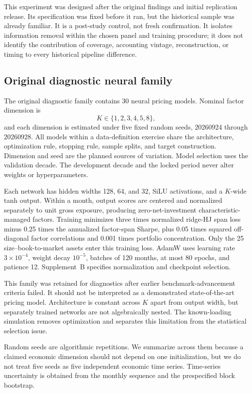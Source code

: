 This experiment was designed after the original findings and initial replication release. Its specification was fixed before it ran, but the historical sample was already familiar. It is a post-study control, not fresh confirmation. It isolates information removal within the chosen panel and training procedure; it does not identify the contribution of coverage, accounting vintage, reconstruction, or timing to every historical pipeline difference.

\subsection{Original diagnostic neural family}

The original diagnostic family contains 30 neural pricing models. Nominal factor dimension is
\[
 K\in\{1,2,3,4,5,8\},
\]
and each dimension is estimated under five fixed random seeds, 20260924 through 20260928. All models within a data-definition exercise share the architecture, optimization rule, stopping rule, sample splits, and target construction. Dimension and seed are the planned sources of variation. Model selection uses the validation decade. The development decade and the locked period never alter weights or hyperparameters.

Each network has hidden widths 128, 64, and 32, SiLU activations, and a $K$-wide tanh output. Within a month, output scores are centered and normalized separately to unit gross exposure, producing zero-net-investment characteristic-managed factors. Training minimizes three times normalized ridge-HJ span loss minus 0.25 times the annualized factor-span Sharpe, plus 0.05 times squared off-diagonal factor correlations and 0.001 times portfolio concentration. Only the 25 size--book-to-market assets enter this training loss. AdamW uses learning rate $3\times10^{-4}$, weight decay $10^{-5}$, batches of 120 months, at most 80 epochs, and patience 12. Supplement~B specifies normalization and checkpoint selection.

This family was retained for diagnostics after earlier benchmark-advancement criteria failed. It should not be interpreted as a demonstrated state-of-the-art pricing model. Architecture is constant across $K$ apart from output width, but separately trained networks are not algebraically nested. The known-loading simulation removes optimization and separates this limitation from the statistical selection issue.

Random seeds are algorithmic repetitions. We summarize across them because a claimed economic dimension should not depend on one initialization, but we do not treat five seeds as five independent economic time series. Time-series uncertainty is obtained from the monthly sequence and the prespecified block bootstrap.

